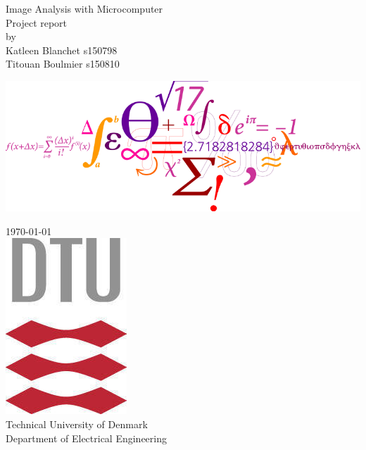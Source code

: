 \documentclass[12pt,a4paper,fleqn, onesside]{report}
\begin{document}
\begin{titlepage}
\begin{center}
\vspace{4cm}
\Huge{ Image Analysis with Microcomputer}\\
\vspace{0.8cm}
\large{\sc Project report\\}
\vspace{1.2cm}
\normalsize{by}\\
\vspace{1.2cm}
{\sc
\large Katleen Blanchet s150798  \\ 
Titouan Boulmier s150810\\
}
\vspace{2cm}
\begin{center}
\includegraphics[scale=2.2]{dtulogo2.jpg}
\end{center} 
\vspace{3.1cm}
\normalsize{\today}\\
\vspace{1.37cm}
\includegraphics[scale=0.7]{dtulogo.jpg}\\
\vspace{0.2cm}
\normalsize{Technical University of Denmark \\ Department of Electrical Engineering \\
}
\end{center}
\end{titlepage}
\thispagestyle{empty}
\end{document}
